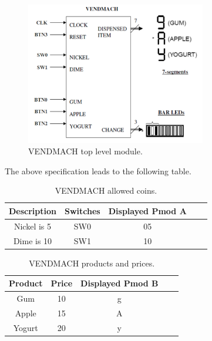 \begin{figure}[htbp]
	\centering
	\includegraphics[width=0.7\textwidth]{01_images/Vivado_lab3_DesignSpec3_ModuleOverview.PNG}
	\caption{VENDMACH top level module.}
	\label{fig: Vivado_lab3_DesignSpec3_ModuleOverview}
\end{figure}

The above specification leads to the following table.
\begin{table}[ht]
	\begin{center}
		\begin{tabular}{|| c | c | c | c | c ||} 
			\hline
			  Description & Switches & Displayed Pmod A  \\ [0.5ex] 
			\hline\hline
			Nickel is 5 \cent 	& SW0 	& 	05  	\\ \hline
			Dime is 10 \cent 	& SW1	&	10  	\\ \hline
			
		\end{tabular}
	\end{center}
	\caption{VENDMACH allowed coins.}
\end{table}

\begin{table}[ht]
	\begin{center}
		\begin{tabular}{|| c | c | c | c | c ||} 
			\hline
			Product & Price  & Displayed Pmod B \\ [0.5ex] 
			\hline\hline
			Gum  	& 10 \cent	& g		\\ \hline
			Apple 	& 15 \cent	& A  	\\ \hline
			Yogurt 	& 20 \cent	& y  	\\ \hline
			
		\end{tabular}
	\end{center}
	\caption{VENDMACH products and prices.}
\end{table}

